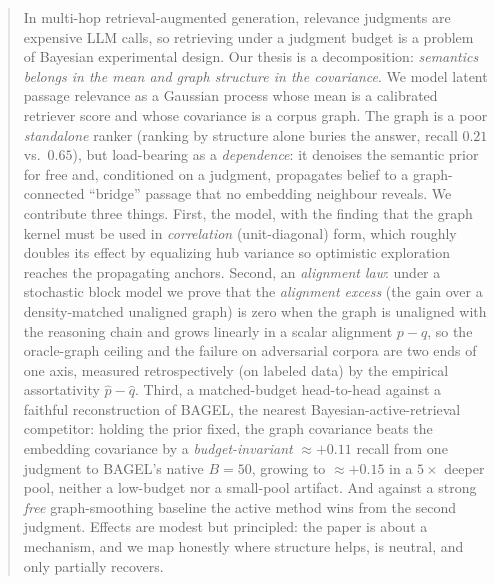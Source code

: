 \documentclass[twoside]{article}
\theoremstyle{plain}
\theoremstyle{definition}
\begin{document}

\begin{abstract}
In multi-hop retrieval-augmented generation, relevance judgments are expensive LLM calls, so retrieving under a
judgment budget is a problem of Bayesian experimental design. Our thesis is a decomposition: \emph{semantics
belongs in the mean and graph structure in the covariance}. We model latent passage relevance as a Gaussian
process whose mean is a calibrated retriever score and whose covariance is a corpus graph. The graph is a poor
\emph{standalone} ranker (ranking by structure alone buries the answer, recall $0.21$ vs.\ $0.65$), but
load-bearing as a \emph{dependence}: it denoises the semantic prior for free and, conditioned on a judgment,
propagates belief to a graph-connected ``bridge'' passage that no embedding neighbour reveals. We contribute three
things. First, the model, with the finding that the graph kernel must be used in \emph{correlation} (unit-diagonal)
form, which roughly doubles its effect by equalizing hub variance so optimistic exploration reaches the propagating
anchors. Second, an \emph{alignment law}: under a stochastic block model we prove that the \emph{alignment excess}
(the gain over a density-matched unaligned graph) is zero when the graph is unaligned with the reasoning chain and
grows linearly in a scalar alignment $p-q$, so the oracle-graph ceiling and the failure on adversarial corpora are
two ends of one axis, measured retrospectively (on labeled data) by the empirical assortativity $\hat p-\hat q$.
Third, a matched-budget head-to-head against a faithful reconstruction of BAGEL, the nearest
Bayesian-active-retrieval competitor: holding the prior fixed, the graph covariance beats the embedding covariance
by a \emph{budget-invariant} $\approx+0.11$ recall from one judgment to BAGEL's native $B{=}50$, growing to
$\approx+0.15$ in a $5\times$ deeper pool, neither a low-budget nor a small-pool artifact. And against a strong
\emph{free} graph-smoothing baseline the active method wins from the second judgment. Effects are modest but
principled: the paper is about a mechanism, and we map honestly where structure helps, is neutral, and only
partially recovers.
\end{abstract}
\end{document}
